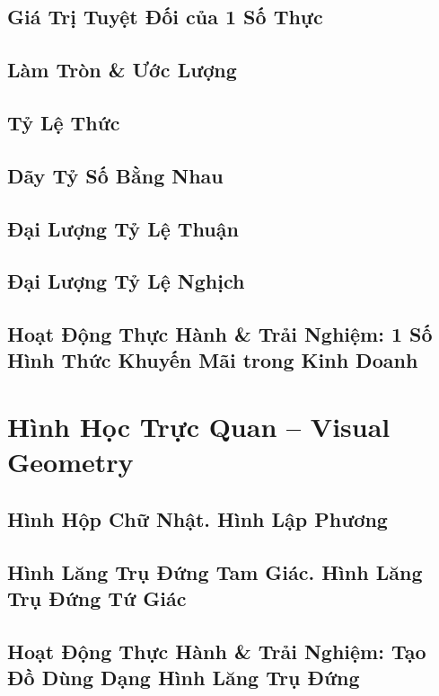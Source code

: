 \documentclass[oneside]{book}
\numberwithin{equation}{section}
\begin{document}
\section{Giá Trị Tuyệt Đối của 1 Số Thực}

\section{Làm Tròn \& Ước Lượng}

\section{Tỷ Lệ Thức}

\section{Dãy Tỷ Số Bằng Nhau}

\section{Đại Lượng Tỷ Lệ Thuận}

\section{Đại Lượng Tỷ Lệ Nghịch}

\section{Hoạt Động Thực Hành \& Trải Nghiệm: 1 Số Hình Thức Khuyến Mãi trong Kinh Doanh}


\chapter{Hình Học Trực Quan -- Visual Geometry}

\section{Hình Hộp Chữ Nhật. Hình Lập Phương}

\section{Hình Lăng Trụ Đứng Tam Giác. Hình Lăng Trụ Đứng Tứ Giác}

\section{Hoạt Động Thực Hành \& Trải Nghiệm: Tạo Đồ Dùng Dạng Hình Lăng Trụ Đứng}
\end{document}
